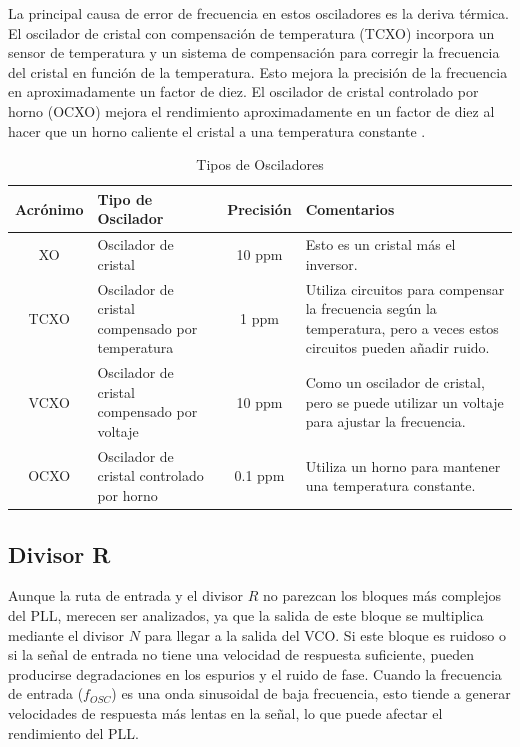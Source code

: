 La principal causa de error de frecuencia en estos osciladores es la deriva térmica. El oscilador de cristal con compensación de temperatura (TCXO) incorpora un sensor de temperatura y un sistema de compensación para corregir la frecuencia del cristal en función de la temperatura. Esto mejora la precisión de la frecuencia en aproximadamente un factor de diez. El oscilador de cristal controlado por horno (OCXO) mejora el rendimiento aproximadamente en un factor de diez al hacer que un horno caliente el cristal a una temperatura constante \cite{Dean Banerjee}.

\begin{table}[h!]
\centering
\renewcommand{\arraystretch}{1.5}
\begin{tabular}{|c|>{\raggedright\arraybackslash}p{4.2cm}|c|>{\raggedright\arraybackslash}p{6cm}|}
\hline
\textbf{Acrónimo} & \textbf{Tipo de Oscilador} & \textbf{Precisión} & \textbf{Comentarios} \\
\hline
XO & Oscilador de cristal & 10 ppm & Esto es un cristal más el inversor. \\
\hline
TCXO & Oscilador de cristal compensado por temperatura & 1 ppm & Utiliza circuitos para compensar la frecuencia según la temperatura, pero a veces estos circuitos pueden añadir ruido. \\
\hline
VCXO & Oscilador de cristal compensado por voltaje & 10 ppm & Como un oscilador de cristal, pero se puede utilizar un voltaje para ajustar la frecuencia. \\
\hline
OCXO & Oscilador de cristal controlado por horno & 0.1 ppm & Utiliza un horno para mantener una temperatura constante. \\
\hline
\end{tabular}
\caption{Tipos de Osciladores}
\label{tab:tipos_osciladores}
\end{table}

\subsection{Divisor R}
Aunque la ruta de entrada y el divisor $R$ no parezcan los bloques más complejos del PLL, merecen ser analizados, ya que la salida de este bloque se multiplica mediante el divisor $N$ para llegar a la salida del VCO. Si este bloque es ruidoso o si la señal de entrada no tiene una velocidad de respuesta suficiente, pueden producirse degradaciones en los espurios y el ruido de fase. Cuando la frecuencia de entrada ($f_{OSC}$) es una onda sinusoidal de baja frecuencia, esto tiende a generar velocidades de respuesta más lentas en la señal, lo que puede afectar el rendimiento del PLL. 

